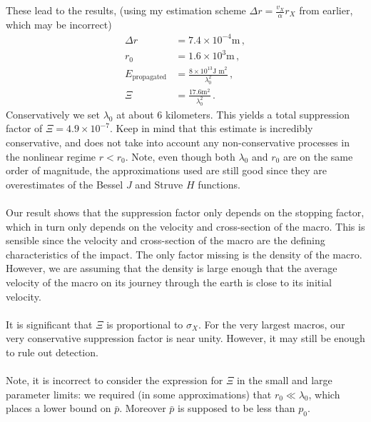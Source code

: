 \documentclass{article}
\newcommand*\te[1]{\text{#1}}
\newcommand*\f[2]{\frac{#1}{#2}}
\begin{document}
These lead to the results, (using my estimation scheme $\Delta r=\f{v_X}{\alpha}r_X$ from earlier, which may be incorrect)
\begin{align}
\Delta r&=7.4\times 10^{-4}\te{m}\,,\\
r_0&=1.6\times 10^3\te{m}\,,\\
E_{\te{propagated}}&=\f{8\times 10^{13}\te{J m}^2}{\lambda_0^2}\,,\\
\Xi&=\f{17.6\te{m}^2}{\lambda_0^2}\,.
\end{align}
Conservatively we set $\lambda_0$ at about $6$ kilometers. This yields a total suppression factor of $\Xi=4.9\times 10^{-7}$. Keep in mind that this estimate is incredibly conservative, and does not take into account any non-conservative processes in the nonlinear regime $r<r_0$. Note, even though both $\lambda_0$ and $r_0$ are on the same order of magnitude, the approximations used are still good since they are overestimates of the Bessel $J$ and Struve $H$ functions.
\\\\
Our result shows that the suppression factor only depends on the stopping factor, which in turn only depends on the velocity and cross-section of the macro. This is sensible since the velocity and cross-section of the macro are the defining characteristics of the impact. The only factor missing is the density of the macro. However, we are assuming that the density is large enough that the average velocity of the macro on its journey through the earth is close to its initial velocity.
\\\\
It is significant that $\Xi$ is proportional to $\sigma_X$. For the very largest macros, our very conservative suppression factor is near unity. However, it may still be enough to rule out detection.
\\\\
Note, it is incorrect to consider the expression for $\Xi$ in the small and large parameter limits: we required (in some approximations) that $r_0\ll \lambda_0$, which places a lower bound on $\bar p$. Moreover $\bar p$ is supposed to be less than $p_0$.
\pagebreak
\end{document}
